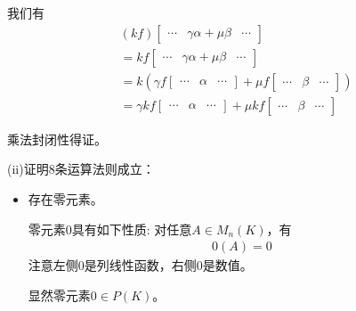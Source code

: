 \documentclass{article}
\begin{document}
\begin{itemize}
\begin{itemize}
                我们有
                \begin{align*}
                   & (kf)\begin{bmatrix}
                           \cdots & \gamma \alpha + \mu \beta & \cdots
                         \end{bmatrix}                  \\
                   & =k f \begin{bmatrix}
                            \cdots & \gamma \alpha + \mu \beta & \cdots
                          \end{bmatrix}                 \\
                   & = k \left(\gamma f \begin{bmatrix}
                                          \cdots & \alpha & \cdots
                                        \end{bmatrix} + \mu f \begin{bmatrix}
                                                                \cdots & \beta & \cdots
                                                              \end{bmatrix}\right) \\
                   & =  \gamma kf \begin{bmatrix}
                                    \cdots & \alpha & \cdots
                                  \end{bmatrix}
                  + \mu kf \begin{bmatrix}
                             \cdots & \beta & \cdots
                           \end{bmatrix}
                \end{align*}

                乘法封闭性得证。
        \end{itemize}

        (ii)证明8条运算法则成立：

        \begin{itemize}
          \item 存在零元素。

                零元素$0$具有如下性质: 对任意$A \in M_n(K)$，有
                \begin{align*}
                  0(A) = 0
                \end{align*}
                注意左侧$0$是列线性函数，右侧$0$是数值。

                显然零元素$0 \in P(K)$。


\end{itemize}
\end{itemize}
\end{document}

